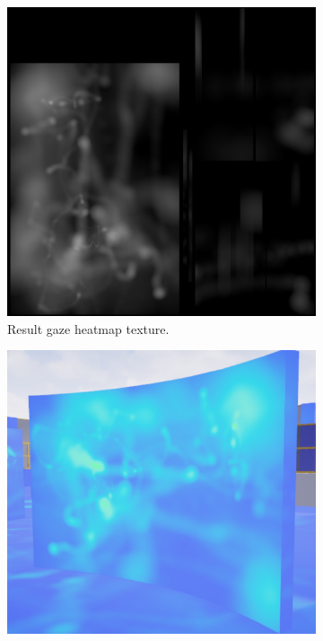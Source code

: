 \begin{figure}[!ht]\centering
    \begin{subfigure}[b]{0.31\textwidth}
        \centering
        \includegraphics[width=\textwidth]{img/data/Panel17/resultant/Result.png}
        \caption{Result gaze heatmap texture.}
    \end{subfigure}
    \hfill
    \begin{subfigure}[b]{0.335\textwidth}
        \centering
        \includegraphics[width=\textwidth]{img/data/Panel17/resultant/heatmap.png}

\end{subfigure}
\end{figure}
